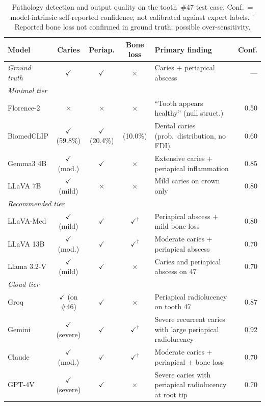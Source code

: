 \documentclass[12pt,a4paper]{report}
\begin{document}
\begin{table}[H]
\centering
\caption{Pathology detection and output quality on the tooth~\#47 test case.
Conf.\ = model-intrinsic self-reported confidence, not calibrated against expert labels.
${}^{\dagger}$Reported bone loss not confirmed in ground truth; possible over-sensitivity.}
\label{tab:pathology_detection}
\small
\renewcommand{\arraystretch}{1.2}
\begin{tabularx}{\textwidth}{@{}l c c c X r@{}}
\toprule
\textbf{Model} & \textbf{Caries} & \textbf{Periap.} & \textbf{Bone loss} & \textbf{Primary finding} & \textbf{Conf.} \\
\midrule
\textit{Ground truth} & $\checkmark$ & $\checkmark$ & $\times$ & Caries + periapical abscess & --- \\
\midrule
\multicolumn{6}{l}{\textit{Minimal tier}} \\
Florence-2  & $\times$ & $\times$ & $\times$ & ``Tooth appears healthy'' (null struct.) & 0.50 \\
BiomedCLIP  & $\checkmark$ (59.8\%) & $\checkmark$ (20.4\%) & (10.0\%) & Dental caries (prob.\ distribution, no FDI) & 0.60 \\
Gemma3 4B   & $\checkmark$ (mod.) & $\checkmark$ & $\times$ & Extensive caries + periapical inflammation & 0.85 \\
LLaVA 7B    & $\checkmark$ (mild) & $\times$ & $\times$ & Mild caries on crown only & 0.80 \\
\midrule
\multicolumn{6}{l}{\textit{Recommended tier}} \\
LLaVA-Med   & $\checkmark$ (mild) & $\checkmark$ & $\checkmark^{\dagger}$ & Periapical abscess + mild bone loss & 0.80 \\
LLaVA 13B   & $\checkmark$ (mod.) & $\checkmark$ & $\checkmark^{\dagger}$ & Moderate caries + periapical abscess & 0.70 \\
Llama 3.2-V & $\checkmark$ (mild) & $\checkmark$ & $\times$ & Caries and periapical abscess on 47 & 0.70 \\
\midrule
\multicolumn{6}{l}{\textit{Cloud tier}} \\
Groq        & $\checkmark$ (on \#46) & $\checkmark$ & $\times$ & Periapical radiolucency on tooth 47 & 0.87 \\
Gemini      & $\checkmark$ (severe) & $\checkmark$ & $\checkmark^{\dagger}$ & Severe recurrent caries with large periapical radiolucency & 0.92 \\
Claude      & $\checkmark$ (mod.) & $\checkmark$ & $\checkmark^{\dagger}$ & Moderate caries + periapical + bone loss & 0.70 \\
GPT-4V      & $\checkmark$ (severe) & $\checkmark$ & $\times$ & Severe caries with periapical radiolucency at root tip & 0.70 \\
\bottomrule
\end{tabularx}
\end{table}
\end{document}
